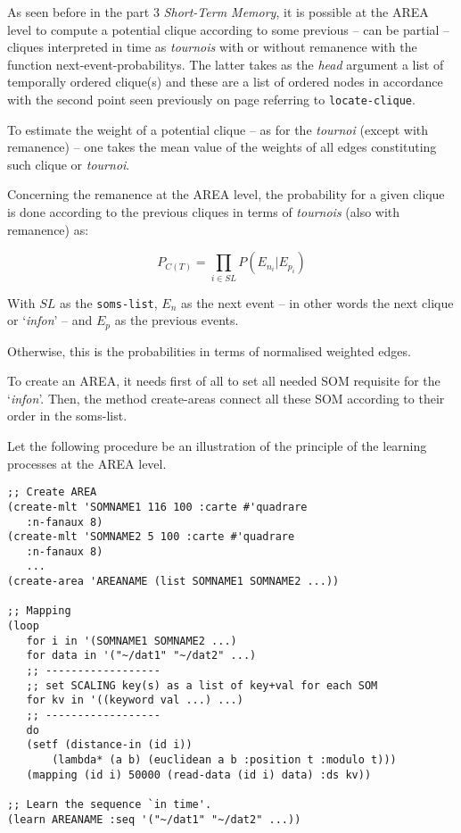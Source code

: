 \bigskip

As seen before in the part 3 \textsl{Short-Term Memory}, it is possible at the AREA level to compute a potential clique according to some previous -- can be partial -- cliques interpreted in time as \textit{tournois} with or without remanence with the function \glspl{next-event-probability}. The latter takes as the \textit{head} argument a list of temporally ordered clique(s) and these are a list of ordered nodes in accordance with the second point seen previously on page \pageref{txt:on} referring to \texttt{locate-clique}.

\smallskip

To estimate the weight of a potential clique -- as for the \textit{tournoi} (except with remanence) -- one takes the mean value of the weights of all edges constituting such clique or \textit{tournoi}. 

\smallskip
\newpage
Concerning the remanence at the AREA level, the probability for a given clique is done according to the previous cliques in terms of \textit{tournois} (also with remanence) as:

$$P_{C(T)} = \displaystyle \prod_{i \in SL} P(E_{n_i}|E_{p_i})$$

With $SL$ as the \texttt{soms-list}, $E_{n}$ as the next event -- in other words the next clique or `\textit{infon}' -- and  $E_{p}$ as the previous events.

\smallskip

Otherwise, this is the probabilities in terms of normalised weighted edges.

\bigskip
\bigskip


\bigskip

To create an AREA, it needs first of all to set all needed SOM requisite for the `\textit{infon}'. Then, the method \glspl{create-area} connect all these SOM according to their order in the soms-list.

\bigskip

Let the following procedure be an illustration of the principle of the learning processes at the AREA level.

\begin{lstlisting}[language=N3]
;; Create AREA
(create-mlt 'SOMNAME1 116 100 :carte #'quadrare
   :n-fanaux 8)
(create-mlt 'SOMNAME2 5 100 :carte #'quadrare 
   :n-fanaux 8)
   ...
(create-area 'AREANAME (list SOMNAME1 SOMNAME2 ...))

;; Mapping 
(loop
   for i in '(SOMNAME1 SOMNAME2 ...)
   for data in '("~/dat1" "~/dat2" ...)
   ;; ------------------
   ;; set SCALING key(s) as a list of key+val for each SOM
   for kv in '((keyword val ...) ...) 
   ;; ------------------
   do
   (setf (distance-in (id i))
	   (lambda* (a b) (euclidean a b :position t :modulo t)))
   (mapping (id i) 50000 (read-data (id i) data) :ds kv))
     
;; Learn the sequence `in time'.
(learn AREANAME :seq '("~/dat1" "~/dat2" ...))
\end{lstlisting}

